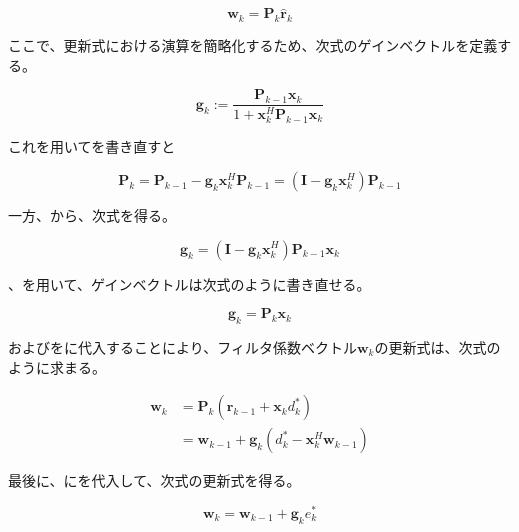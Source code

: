 \begin{equation}
\bm{w}_k = \bm{P}_k \hat{\bm{r}}_k
\label{equ:w_simple_rls}
\end{equation}


ここで、更新式における演算を簡略化するため、次式のゲインベクトルを定義する。

\begin{equation}
\bm{g}_k := \frac{\bm{P}_{k-1} \bm{x}_k}{1 + \bm{x}_k^H \bm{P}_{k-1} \bm{x}_k}
\label{equ:g_k_complex}
\end{equation}

これを用いてを書き直すと


\begin{equation}
\bm{P}_k = \bm{P}_{k-1} - \bm{g}_k \bm{x}_k^H \bm{P}_{k-1} = (\bm{I} - \bm{g}_k \bm{x}_k^H) \bm{P}_{k-1}
\label{equ:P_k_flat}
\end{equation}

一方、から、次式を得る。

\begin{equation}
\bm{g}_k = (\bm{I} - \bm{g}_k \bm{x}_k^H) \bm{P}_{k-1} \bm{x}_k
\label{equ:g_k_flat}
\end{equation}


、を用いて、ゲインベクトルは次式のように書き直せる。


\begin{equation}
\bm{g}_k = \bm{P}_k \bm{x}_k
\label{equ:g_k_simple}
\end{equation}


およびをに代入することにより、フィルタ係数ベクトル\(\bm{w}_k\)の更新式は、次式のように求まる。

\begin{equation}
\begin{split}
\bm{w}_k &= \bm{P}_k (\hat{\bm{r}}_{k-1} + \bm{x}_k d_k^*) \\
         &= \bm{w}_{k-1} + \bm{g}_k (d_k^* - \bm{x}_k^H \bm{w}_{k-1})
\end{split}
\label{equ:w_k_complex}
\end{equation}


最後に、にを代入して、次式の更新式を得る。

\begin{equation}
\bm{w}_k = \bm{w}_{k-1} + \bm{g}_k e_k^*
\end{equation}


